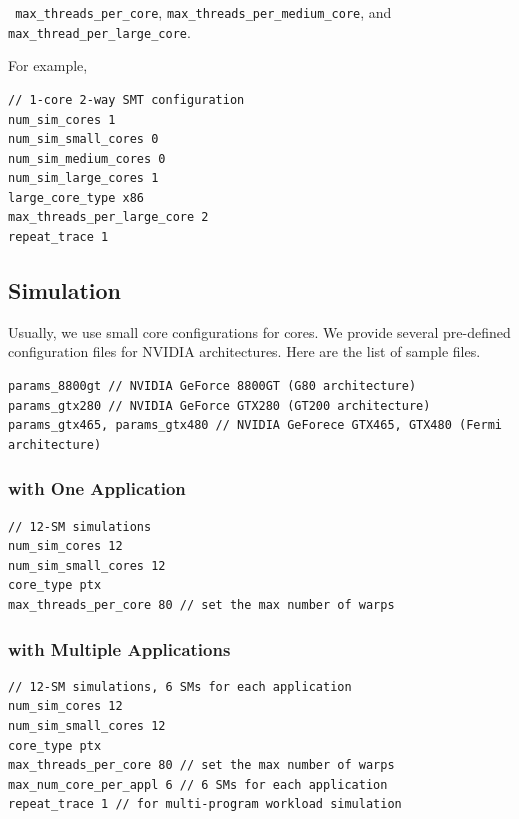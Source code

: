\Verb+ max_threads_per_core+, \Verb+max_threads_per_medium_core+, and
\Verb+max_thread_per_large_core+. 

\noindent
For example,

\begin{Verbatim}
// 1-core 2-way SMT configuration
num_sim_cores 1
num_sim_small_cores 0
num_sim_medium_cores 0
num_sim_large_cores 1
large_core_type x86
max_threads_per_large_core 2
repeat_trace 1
\end{Verbatim}



\subsection{\gpu Simulation}

Usually, we use small core configurations for \gpu cores. We provide
several pre-defined configuration files for NVIDIA architectures. Here
are the list of sample files.

\begin{Verbatim}
params_8800gt // NVIDIA GeForce 8800GT (G80 architecture)
params_gtx280 // NVIDIA GeForce GTX280 (GT200 architecture)
params_gtx465, params_gtx480 // NVIDIA GeForece GTX465, GTX480 (Fermi architecture)
\end{Verbatim}


\subsubsection{\gpu with One Application}

\begin{Verbatim}
// 12-SM simulations
num_sim_cores 12
num_sim_small_cores 12
core_type ptx
max_threads_per_core 80 // set the max number of warps 
\end{Verbatim}


\subsubsection{\gpu with Multiple Applications}

\begin{Verbatim}
// 12-SM simulations, 6 SMs for each application
num_sim_cores 12
num_sim_small_cores 12
core_type ptx
max_threads_per_core 80 // set the max number of warps 
max_num_core_per_appl 6 // 6 SMs for each application
repeat_trace 1 // for multi-program workload simulation
\end{Verbatim}


